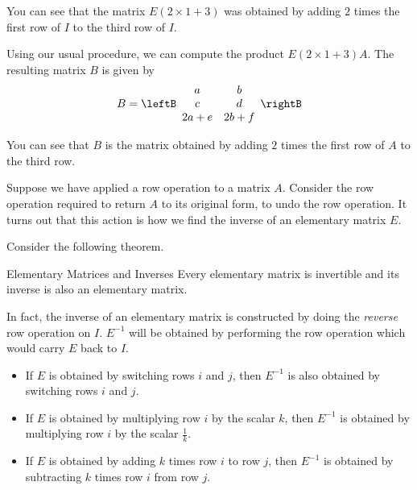 \begin{solution}
You can see that the matrix $E\left( 2 \times 1+3\right)$ was obtained by adding $2$ times the first row
of $I$ to the third row of $I$. 

Using our usual procedure, we can compute the product $E\left( 2 \times 1+3\right)A$. The resulting 
matrix $B$ is given by 
\begin{equation*}
B = \leftB
\begin{array}{cc}
a & b \\
c & d \\
2a+e & 2b+f
\end{array}
\rightB
\end{equation*}

You can see that $B$ is the matrix obtained by adding $2$ times the first row of $A$ to the third row. 
\end{solution}

Suppose we have applied a row operation to a matrix $A$. Consider the row operation required to return $A$ to its original form, to undo
the row operation. It turns out that this action is how we find the inverse of an elementary matrix $E$. 

Consider the following theorem.

\begin{theorem}{Elementary Matrices and Inverses}\label{thm:inverseelemmatrix}
Every elementary matrix is invertible and its inverse is also an elementary matrix. 
\end{theorem}

In fact, the inverse of an elementary matrix is constructed by doing the {\em reverse \em}row operation on $I$. $E^{-1}$ will
be obtained by performing the row operation which would carry $E$ back to $I$. 

\begin{itemize}
\item If $E$ is obtained by switching rows $i$ and $j$, then $E^{-1}$ is also obtained by switching rows $i$ and $j$. 

\item If $E$ is obtained by multiplying row $i$ by the scalar $k$, then $E^{-1}$ is obtained by multiplying row $i$ by
the scalar $\frac{1}{k}$. 

\item If $E$ is obtained by adding $k$ times row $i$ to row $j$, then $E^{-1}$ is obtained by 
subtracting $k$ times row $i$ from row $j$.
\end{itemize} 

